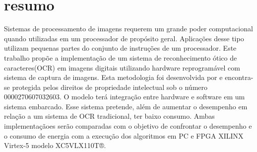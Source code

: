 \chapter{resumo} Sistemas de processamento de imagens requerem um grande poder
computacional quando utilizadas em um processador de propósito geral.
Aplicações desse tipo utilizam pequenas partes do conjunto de instruções de um
processador. Este trabalho propõe a implementação de um sistema de reconhecimento
ótico de caracteres(OCR) em imagens digitais utilizando hardware
reprogramável com sistema de captura de imagens. Esta metodologia foi
desenvolvida por \cite{PACHECO} e encontra-se protegida pelos
direitos de propriedade intelectual sob o número 0000270607032603. O modelo
terá integração entre hardware e software em um sistema embarcado.  Esse
sistema pretende, além de aumentar o desempenho em relação a um sistema de OCR
tradicional, ter baixo consumo. Ambas implementaçãoes serão comparadas com o
objetivo de confrontar o desempenho e o consumo de energia com a execução dos
algoritmos em PC e FPGA XILINX Virtex-5 modelo XC5VLX110T®.



